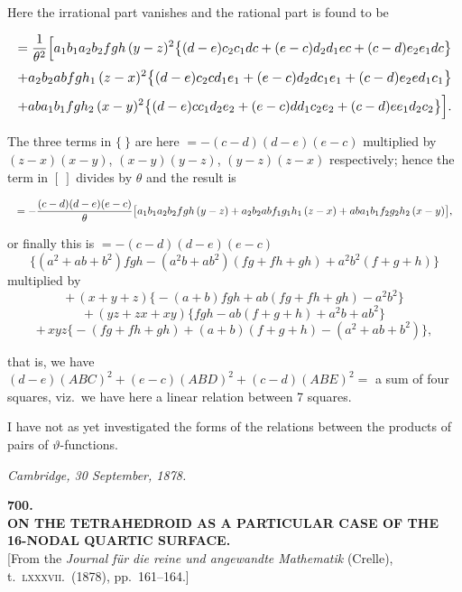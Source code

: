 \documentclass[11pt]{article}
\begin{document}
\medskip

Here the irrational part vanishes and the rational part is found to be

\[
\resizebox{\textwidth}{!}{$\displaystyle
= \frac{1}{\theta^2}\Bigl[a_1 b_1 a_2 b_2 fgh\,(y-z)^2\bigl\{(d-e)c_2 c_1 dc + (e-c)d_2 d_1 ec + (c-d)e_2 e_1 dc\bigr\}
$}
\]
\[
\resizebox{\textwidth}{!}{$\displaystyle
+ a_2 b_2 a b fgh_1\,(z-x)^2\bigl\{(d-e)c_2 c d_1 e_1 + (e-c)d_2 d c_1 e_1 + (c-d)e_2 e d_1 c_1\bigr\}
$}
\]
\[
\resizebox{\textwidth}{!}{$\displaystyle
+ a b a_1 b_1 fgh_2\,(x-y)^2\bigl\{(d-e)c c_1 d_2 e_2 + (e-c)d d_1 c_2 e_2 + (c-d)e e_1 d_2 c_2\bigr\}\Bigr].
$}
\]

The three terms in $\{\ \}$ are here $= -(c-d)(d-e)(e-c)$ multiplied by $(z-x)(x-y)$, $(x-y)(y-z)$, $(y-z)(z-x)$ respectively; hence the term in $[\ ]$ divides by $\theta$ and the result is

\[
\resizebox{\textwidth}{!}{$\displaystyle
= -\frac{(c-d)(d-e)(e-c)}{\theta}\bigl[a_1 b_1 a_2 b_2 fgh\,(y-z) + a_2 b_2 a b f_1 g_1 h_1\,(z-x) + a b a_1 b_1 f_2 g_2 h_2\,(x-y)\bigr],
$}
\]

or finally this is $= -(c-d)(d-e)(e-c)$
\[
\bigl\{(a^2 + ab + b^2)fgh - (a^2 b + ab^2)(fg + fh + gh) + a^2 b^2 (f + g + h)\bigr\}
\]
multiplied by
\[
+\,(x+y+z)\bigl\{-(a+b)fgh + ab(fg + fh + gh) - a^2 b^2\bigr\}
\]
\[
+\,(yz + zx + xy)\bigl\{fgh - ab(f+g+h) + a^2 b + a b^2\bigr\}
\]
\[
+\,xyz\bigl\{-(fg + fh + gh) + (a+b)(f+g+h) - (a^2 + ab + b^2)\bigr\},
\]

that is, we have $(d-e)(ABC)^2 + (e-c)(ABD)^2 + (c-d)(ABE)^2 = $ a sum of four squares, viz.\ we have here a linear relation between 7 squares.

\medskip

I have not as yet investigated the forms of the relations between the products of pairs of $\vartheta$-functions.

\medskip
\hfill\textit{Cambridge, 30 September, 1878.}

\bigskip
\begin{center}
\large\textbf{700.}\\[6pt]
\large\textbf{ON THE TETRAHEDROID AS A PARTICULAR CASE OF THE 16-NODAL QUARTIC SURFACE.}\\[6pt]
\small [From the \textit{Journal f\"ur die reine und angewandte Mathematik} (Crelle), t.~\textsc{lxxxvii}.~(1878), pp.~161--164.]
\end{center}
\end{document}
